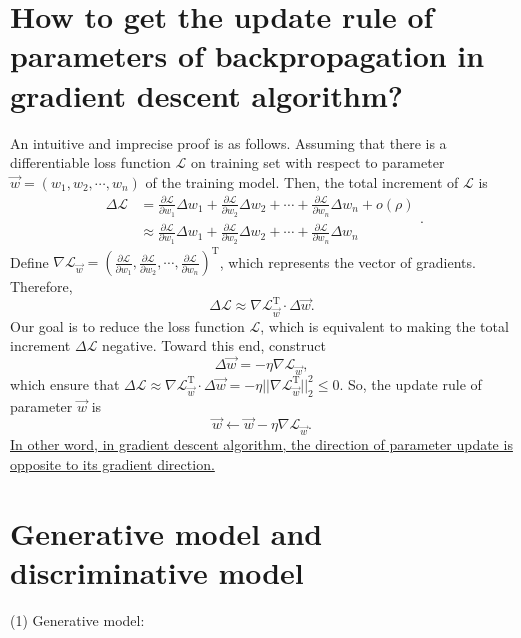 \documentclass[10pt,onecolumn]{book}
\begin{document}
\section{How to get the update rule of parameters of backpropagation in gradient descent algorithm?}
An intuitive and imprecise proof is as follows. Assuming that there is a differentiable loss function $\mathcal{L}$ on training set with respect to parameter $\vec{w} = (w_1, w_2, \cdots, w_n)$ of the training model. Then, the total increment of $\mathcal{L}$ is
\begin{equation}
\begin{split}
\Delta \mathcal{L} & = \frac{\partial \mathcal{L}}{\partial w_1} \Delta w_1 + \frac{\partial \mathcal{L}}{\partial w_2} \Delta w_2 + \cdots + \frac{\partial \mathcal{L}}{\partial w_n} \Delta w_n + o(\rho) \\
				   & \approx \frac{\partial \mathcal{L}}{\partial w_1} \Delta w_1 + \frac{\partial \mathcal{L}}{\partial w_2} \Delta w_2 + \cdots + \frac{\partial \mathcal{L}}{\partial w_n} \Delta w_n
\end{split}.
\end{equation}
Define $\nabla \mathcal{L}_{\vec{w}} = (\frac{\partial \mathcal{L}}{\partial w_1}, \frac{\partial \mathcal{L}}{\partial w_2}, \cdots, \frac{\partial \mathcal{L}}{\partial w_n})^\mathrm{T}$, which represents the vector of gradients. Therefore, 
\begin{equation}
\Delta \mathcal{L} \approx \nabla \mathcal{L}_{\vec{w}}^\mathrm{T} \cdot \Delta \vec{w}.
\end{equation}
Our goal is to reduce the loss function $\mathcal{L}$, which is equivalent to making the total increment $\Delta \mathcal{L}$ negative. Toward this end, construct 
\begin{equation}
\Delta \vec{w} = -\eta \nabla \mathcal{L}_{\vec{w}},
\end{equation}
which ensure that $\Delta \mathcal{L} \approx \nabla \mathcal{L}_{\vec{w}}^\mathrm{T} \cdot \Delta \vec{w} = - \eta ||\nabla \mathcal{L}_{\vec{w}}^\mathrm{T}||_2^2 \le 0$. So, the update rule of parameter $\vec{w}$ is 
\begin{equation}
\vec{w} \gets \vec{w} -\eta \nabla \mathcal{L}_{\vec{w}}.
\end{equation}
\uline{In other word, in gradient descent algorithm, the direction of parameter update is opposite to its gradient direction.}

\section{Generative model and discriminative model}
(1) Generative model:
\end{document}
